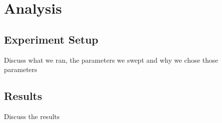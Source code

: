 \section{Analysis}
\label{sec:analysis}

\subsection{Experiment Setup}
Discuss what we ran, the parameters we swept and why we chose those parameters

\subsection{Results}
Discuss the results